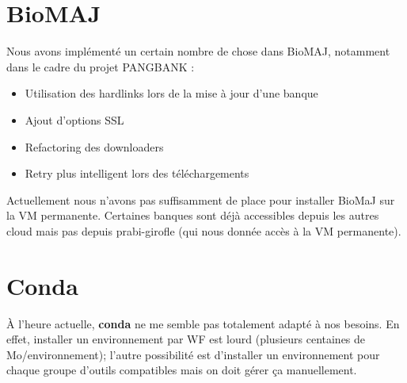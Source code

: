 \section{BioMAJ}

Nous avons implémenté un certain nombre de chose dans BioMAJ, notamment dans le cadre du projet PANGBANK :
\begin{itemize}
    \item Utilisation des hardlinks lors de la mise à jour d'une banque
    \item Ajout d'options SSL
    \item Refactoring des downloaders
    \item Retry plus intelligent lors des téléchargements
\end{itemize}
Actuellement nous n'avons pas suffisamment de place pour installer BioMaJ sur la VM permanente.
Certaines banques sont déjà accessibles depuis les autres cloud mais pas depuis prabi-girofle (qui nous donnée accès à la VM permanente).

\section{Conda}
À l'heure actuelle, \textbf{conda} ne me semble pas totalement adapté à nos besoins.
En effet, installer un environnement par WF est lourd (plusieurs centaines de Mo/environnement); l'autre possibilité est d'installer un environnement pour chaque groupe d'outils compatibles mais on doit gérer ça manuellement.

